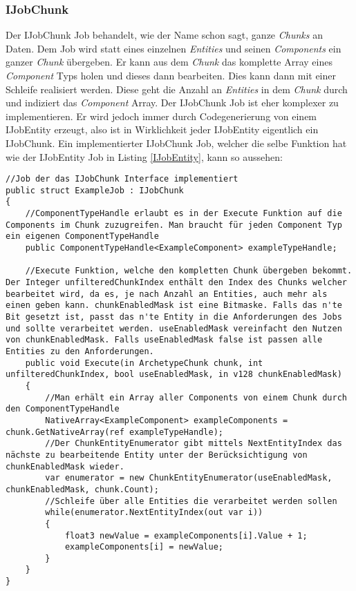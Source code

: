 \subsubsection{IJobChunk}
Der IJobChunk Job behandelt, wie der Name schon sagt, ganze \textit{Chunks} an Daten. Dem Job wird statt eines einzelnen \textit{Entities} und seinen \textit{Components} ein ganzer \textit{Chunk} übergeben. Er kann aus dem \textit{Chunk} das komplette Array eines \textit{Component} Typs holen und dieses dann bearbeiten. Dies kann dann mit einer Schleife realisiert werden. Diese geht die Anzahl an \textit{Entities} in dem \textit{Chunk} durch und indiziert das \textit{Component} Array. Der IJobChunk Job ist eher komplexer zu implementieren. Er wird jedoch immer durch Codegenerierung von einem IJobEntity erzeugt, also ist in Wirklichkeit jeder IJobEntity eigentlich ein IJobChunk. Ein implementierter IJobChunk Job, welcher die selbe Funktion hat wie der IJobEntity Job in Listing \ref{IJobEntity}, kann so aussehen:
\begin{lstlisting}[style=code, caption={IJobChunk Beispiel}, label=IJobChunk]
//Job der das IJobChunk Interface implementiert
public struct ExampleJob : IJobChunk
{
    //ComponentTypeHandle erlaubt es in der Execute Funktion auf die Components im Chunk zuzugreifen. Man braucht für jeden Component Typ ein eigenen ComponentTypeHandle
    public ComponentTypeHandle<ExampleComponent> exampleTypeHandle;

    //Execute Funktion, welche den kompletten Chunk übergeben bekommt. Der Integer unfilteredChunkIndex enthält den Index des Chunks welcher bearbeitet wird, da es, je nach Anzahl an Entities, auch mehr als einen geben kann. chunkEnabledMask ist eine Bitmaske. Falls das n'te Bit gesetzt ist, passt das n'te Entity in die Anforderungen des Jobs und sollte verarbeitet werden. useEnabledMask vereinfacht den Nutzen von chunkEnabledMask. Falls useEnabledMask false ist passen alle Entities zu den Anforderungen.
    public void Execute(in ArchetypeChunk chunk, int unfilteredChunkIndex, bool useEnabledMask, in v128 chunkEnabledMask)
    {
        //Man erhält ein Array aller Components von einem Chunk durch den ComponentTypeHandle
        NativeArray<ExampleComponent> exampleComponents = chunk.GetNativeArray(ref exampleTypeHandle);
        //Der ChunkEntityEnumerator gibt mittels NextEntityIndex das nächste zu bearbeitende Entity unter der Berücksichtigung von chunkEnabledMask wieder.
        var enumerator = new ChunkEntityEnumerator(useEnabledMask, chunkEnabledMask, chunk.Count);
        //Schleife über alle Entities die verarbeitet werden sollen
        while(enumerator.NextEntityIndex(out var i))
        {
            float3 newValue = exampleComponents[i].Value + 1;
            exampleComponents[i] = newValue;
        }
    }
}
\end{lstlisting}

